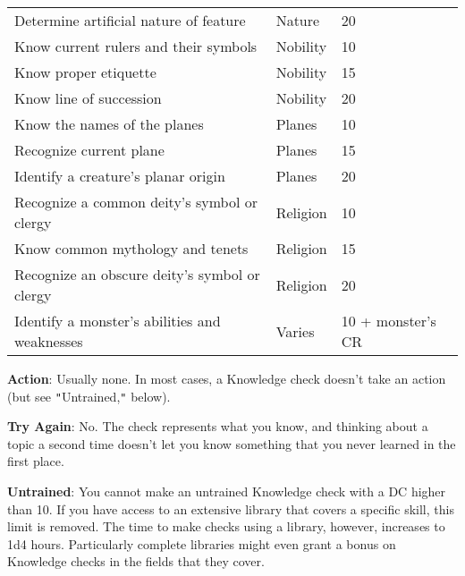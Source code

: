 \begin{table*}[]
\begin{tabular}{lll}
Determine artificial nature of feature& Nature& 20 \\
Know current rulers and their symbols& Nobility& 10 \\
Know proper etiquette& Nobility& 15 \\ 
Know line of succession& Nobility& 20 \\
Know the names of the planes& Planes& 10 \\
Recognize current plane& Planes& 15 \\
Identify a creature's planar origin& Planes& 20 \\
Recognize a common deity's symbol or clergy& Religion& 10 \\
Know common mythology and tenets& Religion& 15 \\
Recognize an obscure deity's symbol or clergy& Religion& 20 \\
Identify a monster's abilities and weaknesses& Varies& 10 + monster's CR\\
\end{tabular}
\end{table*}
				
\textbf{Action}: Usually none. In most cases, a Knowledge check doesn't take an action (but see \texttt{{}"{}}Untrained,\texttt{{}"{}} below).
				
\textbf{Try Again}: No. The check represents what you know, and thinking about a topic a second time doesn't let you know something that you never learned in the first place.
				
\textbf{Untrained}: You cannot make an untrained Knowledge check with a DC higher than 10. If you have access to an extensive library that covers a specific skill, this limit is removed. The time to make checks using a library, however, increases to 1d4 hours. Particularly complete libraries might even grant a bonus on Knowledge checks in the fields that they cover.
        	
